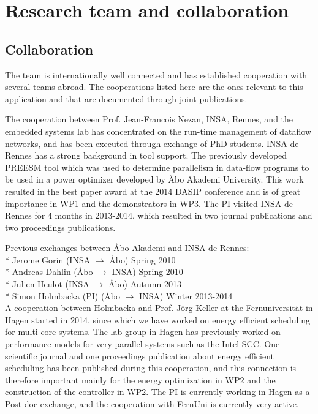\documentclass{article}
\begin{document}
\section{Research team and collaboration}
\subsection{Collaboration}
The team is internationally well connected and has established cooperation with several teams abroad. 
The cooperations listed here are the ones relevant to this application and that are documented through joint publications.

The cooperation between Prof. Jean-Francois Nezan, INSA, Rennes, and the embedded systems lab has concentrated on the run-time management of dataflow networks, 
and has been executed through exchange of PhD students.
INSA de Rennes has a strong background in tool support. 
The previously developed PREESM tool which was used to determine parallelism in data-flow programs to be used in a power optimizer developed by \AA{}bo Akademi University.
This work resulted in the best paper award at the 2014 DASIP conference and is of great importance in WP1 and the demonstrators in WP3.
The PI visited INSA de Rennes for 4 months in 2013-2014, which resulted in two journal publications and two proceedings publications.

Previous exchanges between \AA{}bo Akademi and INSA de Rennes:\\
* Jerome Gorin (INSA $\longrightarrow$ \AA{}bo) Spring 2010\\
* Andreas Dahlin (\AA{}bo $\longrightarrow$ INSA) Spring 2010\\
* Julien Heulot (INSA $\longrightarrow$ \AA{}bo) Autumn 2013\\
* Simon Holmbacka (PI) (\AA{}bo $\longrightarrow$ INSA) Winter 2013-2014\\

A cooperation between Holmbacka and Prof. J\"{o}rg Keller at the Fernuniversit\"{a}t in Hagen started in 2014, since which we have worked on energy efficient scheduling for multi-core systems. 
The lab group in Hagen has previously worked on performance models for very parallel systems such as the Intel SCC.
One scientific journal and one proceedings publication about energy efficient scheduling has been published during this cooperation,
and this connection is therefore important mainly for the energy optimization in WP2 and the construction of the controller in WP2.
The PI is currently working in Hagen as a Post-doc exchange, and the cooperation with FernUni is currently very active.
\end{document}
